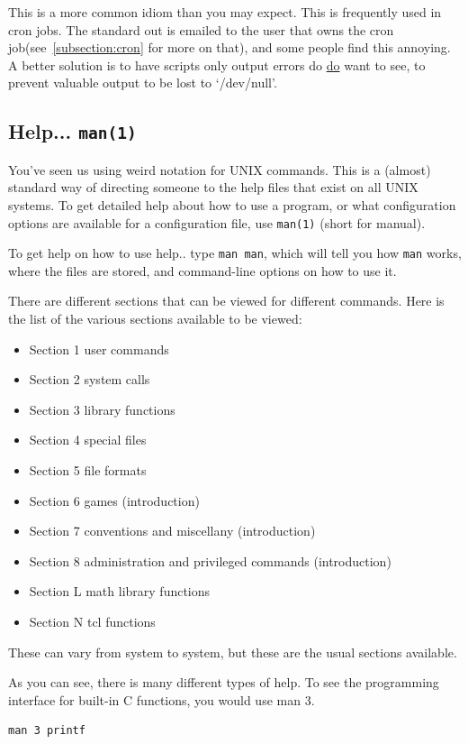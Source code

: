 This is a more common idiom than you may expect. This is frequently used in
cron jobs. The standard out is emailed to the user that owns the cron
job(see~\ref{subsection:cron} for more on that), and some people find this
annoying. A better solution is to have scripts only output errors do \underline{do}
want to see, to prevent valuable output to be lost to `/dev/null'.

\subsection {Help... {\tt man(1)}}
You've seen us using weird notation for UNIX commands. This is a (almost) standard
way of directing someone to the help files that exist on all UNIX systems. 
To get detailed help about how to use a program, or what configuration
options are available for a configuration file, use {\tt man(1)} (short for manual).

To get help on how to use help.. type {\tt man man}, which will 
tell you how {\tt man} works, where the files are stored, and 
command-line options on how to use it.

There are different sections that can be viewed for different commands.
Here is the list of the various sections available to be viewed:

\begin{itemize}
\item Section 1
user commands 
\item Section 2
system calls 
\item Section 3
library functions 
\item Section 4
special files 
\item Section 5
file formats 
\item Section 6
games (introduction)
\item Section 7
conventions and miscellany (introduction)
\item Section 8
administration and privileged commands (introduction)
\item Section L
math library functions
\item Section N
tcl functions
\end{itemize}

These can vary from system to system, but these are the usual sections available.

As you can see, there is many different types of help. To see the programming interface for 
built-in C functions, you would use man 3.

\begin{verbatim}
man 3 printf    
\end{verbatim}

